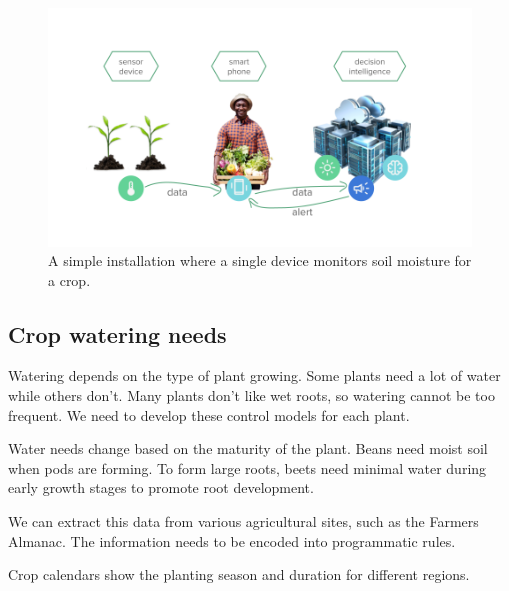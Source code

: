 \documentclass[
]{book}
\begin{document}
\begin{figure}

{\centering \includegraphics[width=13.33in]{images/precision_ag_1} 

}

\caption{A simple installation where a single device monitors soil moisture for a crop.}\label{fig:precision-ag-1}
\end{figure}

\hypertarget{crop-watering-needs}{%
\subsection{Crop watering needs}\label{crop-watering-needs}}

Watering depends on the type of plant growing. Some plants need a lot of water while others don't. Many plants don't like wet roots, so watering cannot be too frequent. We need to develop these control models for each plant.

Water needs change based on the maturity of the plant. Beans need moist soil when pods are forming. To form large roots, beets need minimal water during early growth stages to promote root development.

We can extract this data from various agricultural sites, such as the Farmers Almanac. The information needs to be encoded into programmatic rules.

Crop calendars show the planting season and duration for different regions.
\end{document}
